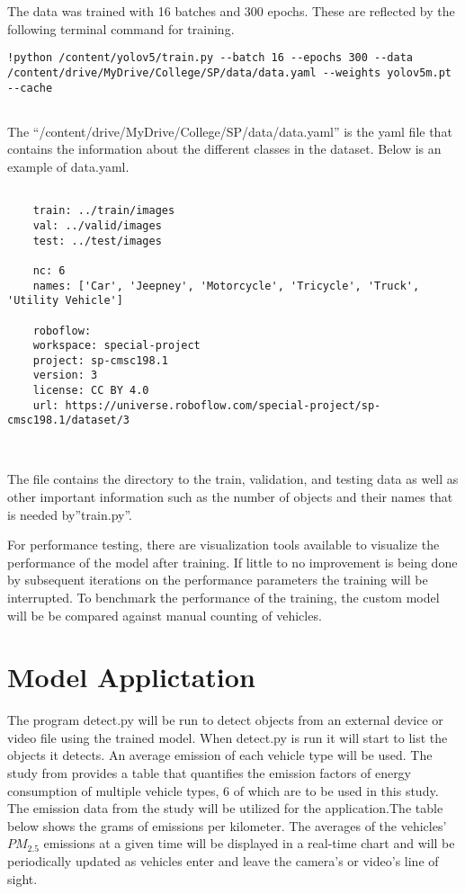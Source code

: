 The data was trained with 16 batches and 300 epochs. These are reflected by the following terminal command for training.

\newpage


\begin{lstlisting}[frame=single]
	!python /content/yolov5/train.py --batch 16 --epochs 300 --data /content/drive/MyDrive/College/SP/data/data.yaml --weights yolov5m.pt --cache
	
\end{lstlisting}


The “/content/drive/MyDrive/College/SP/data/data.yaml” is the yaml file that contains the information about the different classes in the dataset. Below is an example of data.yaml.


\begin{lstlisting}[frame=single]
	
	train: ../train/images
	val: ../valid/images
	test: ../test/images
	
	nc: 6
	names: ['Car', 'Jeepney', 'Motorcycle', 'Tricycle', 'Truck', 'Utility Vehicle']
	
	roboflow:
	workspace: special-project
	project: sp-cmsc198.1
	version: 3
	license: CC BY 4.0
	url: https://universe.roboflow.com/special-project/sp-cmsc198.1/dataset/3
	
	
\end{lstlisting}

The file contains the directory to the train, validation, and testing data as well as other important information such as the number of objects and their names that is needed by”train.py”. 

For performance testing, there are visualization tools available to visualize the performance of the model after training. If little to no improvement is being done by subsequent iterations on the performance parameters the training will be interrupted. To benchmark the performance of the training, the custom model will be be compared against manual counting of vehicles.

\newpage
\section {Model Applictation}
The program detect.py will be run to detect objects from an external device or video file using the trained model. When detect.py is run it will start to list the objects it detects. An average emission of each vehicle type will be used. The study from \cite{rito_lopez_biona_2021} provides a table that quantifies the emission factors of energy consumption of multiple vehicle types, 6 of which are to be used in this study. The emission data from the study will be utilized for the application.The table below shows the grams of emissions per kilometer.
The averages of the vehicles’ $PM_{2.5}$ emissions  at a given time will be displayed in a real-time chart and will be periodically updated as vehicles enter and leave the camera’s or video’s line of sight. 

